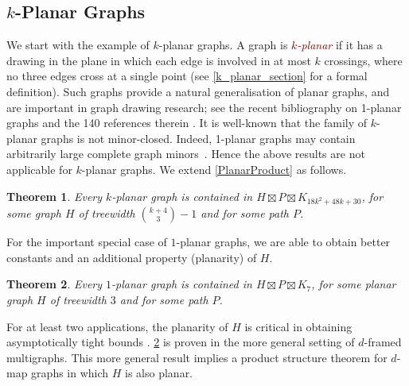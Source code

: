 \documentclass{patmorin}
\theoremstyle{plain}
\newtheorem{thm}{Theorem}
\theoremstyle{definition}
\newcommand{\defin}[1]{\textcolor{Maroon}{\emph{#1}}}
\newcommand{\note}[2]{\noindent{\color{red}[#1:~#2]}}
\begin{document}
\subsection{$k$-Planar Graphs}

We start with the example of $k$-planar graphs. A graph is \defin{$k$-planar} if it has a drawing in the plane in which each edge is involved in at most $k$ crossings, where no three edges cross at a single point (see \cref{k_planar_section} for a formal definition). Such graphs provide a natural generalisation of planar graphs, and are important in graph drawing research; see the recent bibliography on 1-planar graphs and the 140 references therein \citep{kobourov.liotta.ea:annotated}. It is well-known that the family of $k$-planar graphs is not minor-closed.  Indeed, 1-planar graphs may contain arbitrarily large complete graph minors~\citep{dujmovic.eppstein.ea:structure}. Hence the above results are not applicable for  $k$-planar graphs. We extend \cref{PlanarProduct} as follows.

\begin{thm}
\label{kPlanarProduct}
Every $k$-planar graph is contained in $H\boxtimes P\boxtimes K_{18k^2+48k+30}$, for some graph $H$ of treewidth $\binom{k+4}{3}-1$ and for some path $P$.
\end{thm}


For the important special case of $1$-planar graphs, we are able to obtain better constants and an additional property (planarity) of $H$.

\begin{thm}\label{1_planar_product}
  Every $1$-planar graph is contained in $H\boxtimes P\boxtimes K_{7}$, for some planar graph $H$ of treewidth $3$ and for some path $P$.
\end{thm}


For at least two applications, the planarity of $H$ is critical in obtaining asymptotically tight bounds \cite{BDJM,DFMS21}. \cref{1_planar_product} is proven in the more general setting of $d$-framed multigraphs. This more general result implies a product structure theorem for $d$-map graphs in which $H$ is also planar.
\end{document}
